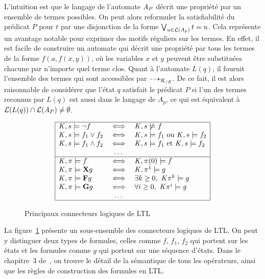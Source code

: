 L'intuition est que le langage de l'automate $\mathit A_P$ décrit une propriété par un ensemble de termes possibles.
On peut alors reformuler la satisfiabilité du prédicat $P$ pour $t$ par une disjonction de la forme 
$\bigvee_{u \in \mathcal{L}(A_p)} t = u$.
Cela représente un avantage notable pour exprimer des motifs réguliers sur les termes. En effet, il est facile 
de construire un automate qui décrit une propriété par tous les termes de la forme $f(a, f(x, y))$,
où les variables $x$ et $y$ peuvent être substituées chacune par n'importe quel terme clos.
Quant à l'automate $L(q)$, il fournit l'ensemble des termes qui sont accessibles par $\dashrightarrow_{\mathcal R_{/E}}$.
De ce fait, il est alors raisonnable de considérer que l'état $q$ satisfait le prédicat $P$ si l'un des termes reconnus par $L(q)$ est aussi
dans le langage de $A_p$, ce qui est équivalent à $\mathcal{L}{}(L(q)) \cap \mathcal{L}{}(\mathit A_P) \neq \emptyset$.
\begin{figure}[ht!]
  \centering
  \[\begin{array}{|lcl|}
    \hline
    \mathit K, s \models \neg f & \; \Longleftrightarrow \; &  \mathit K, s \not\models f\\
    \mathit K, s \models f_1 \lor f_2 & \; \Longleftrightarrow \; & \mathit K, s \models f_1 \textrm{ ou } \mathit K, s \models f_2\\
    \mathit K, s \models f_1 \land f_2 & \; \Longleftrightarrow \; & \mathit K, s \models f_1 \textrm{ et } \mathit K, s \models f_2\\
    &\dots&\\
    \hline
    \mathit K, \pi \models f & \; \Longleftrightarrow \; & \mathit K, \pi(0) \models f\\
    \mathit K, \pi \models \mathbf X g & \; \Longleftrightarrow \; & \mathit K, \pi^1 \models g\\
    \mathit K, \pi \models \mathbf F g & \; \Longleftrightarrow \; & \exists k \ge 0,\ \mathit K \pi^k \models g \\
    \mathit K, \pi \models \mathbf G g & \; \Longleftrightarrow \; & \forall i \ge 0,\ \mathit K \pi^i \models g \\
    &\dots&\\
    \hline
  \end{array}\]
  \caption{Principaux connecteurs logiques de LTL}
  \label{fig:operateursLTL}
\end{figure}
La figure~\ref{fig:operateursLTL} présente un sous-ensemble des
connecteurs logiques de LTL. On peut y distinguer deux types de
formules, celles comme $f$, $f_1$, $f_2$ qui portent sur les états
et les formules comme $g$ qui portent sur une séquence d'états.  Dans le chapitre~3
de~\cite{MC-Book}, on trouve le détail de la sémantique de tous les
opérateurs, ainsi que les règles de construction des formules en LTL.



